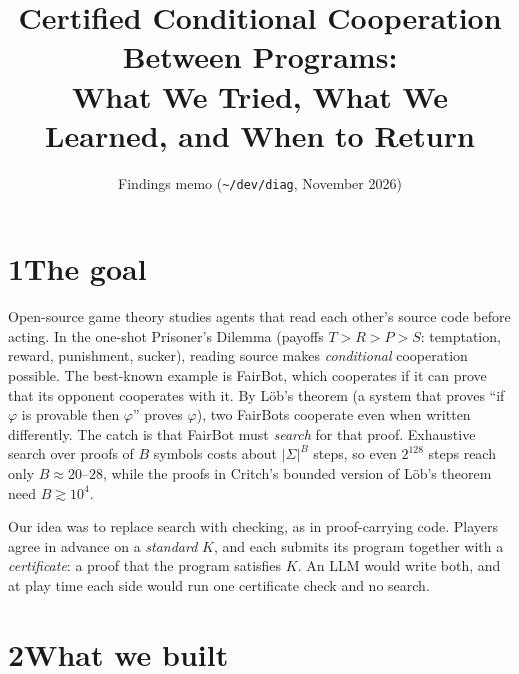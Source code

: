 \documentclass[11pt]{article}
\title{\vspace{-1.5em}Certified Conditional Cooperation Between Programs:\\ What We Tried, What We Learned, and When to Return}
\author{Findings memo \quad (\texttt{\~{}/dev/diag}, November 2026)}
\date{\vspace{-2.5em}}
\begin{document}
\maketitle

\begin{center}
\end{center}

\section*{1\quad The goal}

Open-source game theory studies agents that read each other's source code before acting. In the one-shot Prisoner's Dilemma (payoffs $T > R > P > S$: temptation, reward, punishment, sucker), reading source makes \emph{conditional} cooperation possible. The best-known example is FairBot, which cooperates if it can prove that its opponent cooperates with it. By Löb's theorem (a system that proves ``if $\varphi$ is provable then $\varphi$'' proves $\varphi$), two FairBots cooperate even when written differently. The catch is that FairBot must \emph{search} for that proof. Exhaustive search over proofs of $B$ symbols costs about $|\Sigma|^B$ steps, so even $2^{128}$ steps reach only $B \approx 20$--$28$, while the proofs in Critch's bounded version of Löb's theorem need $B \gtrsim 10^4$.

Our idea was to replace search with checking, as in proof-carrying code. Players agree in advance on a \emph{standard} $K$, and each submits its program together with a \emph{certificate}: a proof that the program satisfies $K$. An LLM would write both, and at play time each side would run one certificate check and no search.

\section*{2\quad What we built}
\end{document}
